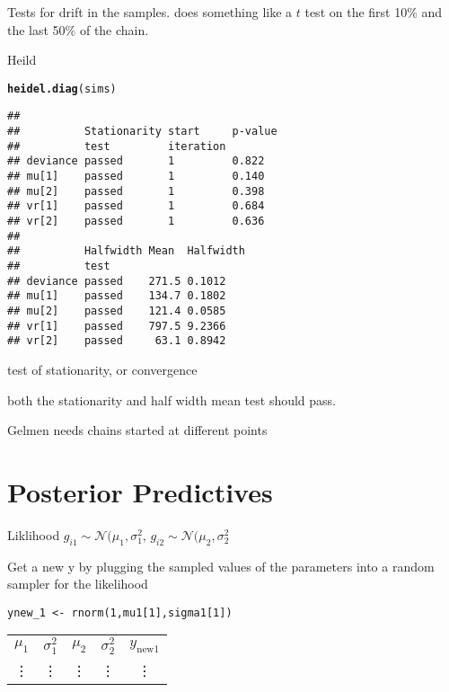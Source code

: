 \documentclass[12pt,letterpaper,oneside]{article}\usepackage{graphicx, color}
\makeatletter
\newcommand{\hlfunctioncall}[1]{\textcolor[rgb]{0.501960784313725,0,0.329411764705882}{\textbf{#1}}}%
\newenvironment{kframe}{%
 \def\at@end@of@kframe{}%
 \ifinner\ifhmode%
  \def\at@end@of@kframe{\end{minipage}}%
  \begin{minipage}{\columnwidth}%
 \fi\fi%
 \def\FrameCommand##1{\hskip\@totalleftmargin \hskip-\fboxsep
 \colorbox{shadecolor}{##1}\hskip-\fboxsep
     \hskip-\linewidth \hskip-\@totalleftmargin \hskip\columnwidth}%
 \MakeFramed {\advance\hsize-\width
   \@totalleftmargin\z@ \linewidth\hsize
   \@setminipage}}%
 {\par\unskip\endMakeFramed%
 \at@end@of@kframe}
\newenvironment{knitrout}{}{} %
\newcommand{\dateTaken}{January 7, 2013}
\makeatother
\begin{document}
Tests for drift in the samples. does something like a $t$ test on the first 10\% and the last 50\% of the chain.

Heild
\begin{knitrout}\scriptsize
{}\color{fgcolor}\begin{kframe}
\begin{alltt}
\hlfunctioncall{heidel.diag}(sims)
\end{alltt}
\begin{verbatim}
##                                        
##          Stationarity start     p-value
##          test         iteration        
## deviance passed       1         0.822  
## mu[1]    passed       1         0.140  
## mu[2]    passed       1         0.398  
## vr[1]    passed       1         0.684  
## vr[2]    passed       1         0.636  
##                                   
##          Halfwidth Mean  Halfwidth
##          test                     
## deviance passed    271.5 0.1012   
## mu[1]    passed    134.7 0.1802   
## mu[2]    passed    121.4 0.0585   
## vr[1]    passed    797.5 9.2366   
## vr[2]    passed     63.1 0.8942
\end{verbatim}
\end{kframe}
\end{knitrout}

test of stationarity, or convergence

both the stationarity and half width mean test should pass.


Gelmen needs chains started at different points
\renewcommand{\dateTaken}{January 22, 2013}
\daysep
\section{Posterior Predictives} %
\label{sec:posterior_sredictives}
Liklihood $g_{i1}\sim \mathcal{N}(\mu_1, \sigma^2_1$, $g_{i2}\sim \mathcal{N}(\mu_2, \sigma^2_2$

Get a new y by plugging the sampled values of the parameters into a random sampler for the likelihood
\begin{lstlisting}
ynew_1 <- rnorm(1,mu1[1],sigma1[1])
\end{lstlisting}

\begin{tabular}{ccccc}
 $\mu_1$ & $\sigma^2_1$ & $\mu_2$ & $\sigma^2_2$ & $y_{\text{new}1}$\\
 \vdots & \vdots & \vdots & \vdots & \vdots
\end{tabular}
\end{document}
